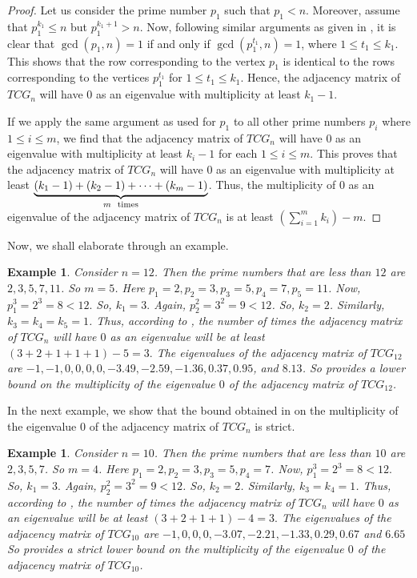 \documentclass[12pt]{article}
\newtheorem{example}[theorem]{Example}
\begin{document}
	
	\begin{proof}
		Let us consider the prime number $p_1$ such that $p_1< n$.
		Moreover, assume that $p_1^{k_1}\le n$ but $p_1^{k_1+1}>n$.
		Now, following similar arguments as given in , it is clear that $\gcd(p_1,n)=1$ if and only if $\gcd(p_1^{t_1},n)=1$, where $1\le t_1\le k_1$.
		This shows that the row corresponding to the vertex $p_1$ is identical to the rows corresponding to the vertices $p_1^{t_1}$ for $1\le t_1\le k_1$.
		Hence, the adjacency matrix of $TCG_n$ will have $0$ as an eigenvalue with multiplicity at least $k_1-1$.
		
		If we apply the same argument as used for $p_1$ to all other prime numbers $p_i$ where $1\le i\le m$, we find that the adjacency matrix of $TCG_n$ will have $0$ as an eigenvalue with multiplicity at least $k_i-1$ for each $1\le i\le m$. This proves that the adjacency matrix of $TCG_n$ will have $0$ as an eigenvalue with multiplicity at least $ \underbrace{(k_1-1)+(k_2-1)+\cdots+(k_m-1)}_{m \hspace{2mm} \text{times}}$. Thus, the multiplicity of $0$ as an eigenvalue of the adjacency matrix of $TCG_n$ is at least $(\sum_{i=1}^m k_i) -m$.
	\end{proof}
	Now, we shall elaborate  through an example.
	\begin{example}
		Consider $n=12$.
		Then the prime numbers that are less than $12$ are $2,3,5,7,11$.
		So $m=5$.
		Here $p_1=2,p_2=3,p_3=5,p_4=7,p_5=11$.
		Now, $p_1^3=2^3=8<12.$ So, $k_1=3.$
		Again, $p_2^2=3^2=9<12$. So, $k_2=2$.
		Similarly, $k_3=k_4=k_5=1$.
		Thus, according to , the number of times the adjacency matrix of $TCG_n$ will have $0$ as an eigenvalue will be at least $(3+2+1+1+1)-5 = 3.$
		The eigenvalues of the adjacency matrix of  $TCG_{12}$ are $-1, -1, 0, 0, 0, 0, -3.49, -2.59, -1.36, 0.37, 0.95$, and $8.13$.
		So  provides a lower bound on the multiplicity of the eigenvalue $0$ of the adjacency matrix of $TCG_{12}$.
		
	\end{example}
	
	In the next example, we show that the bound obtained in  on the multiplicity of the eigenvalue $0$ of the adjacency matrix of $TCG_n$
	is {strict}.
	
	\begin{example}
		Consider $n=10$.
		Then the prime numbers that are less than $10$ are $2,3,5,7$.
		So $m=4$.
		Here $p_1=2,p_2=3,p_3=5,p_4=7$.
		Now, $p_1^3=2^3=8<12.$ So, $k_1=3.$
		Again, $p_2^2=3^2=9<12$. So, $k_2=2$.
		Similarly, $k_3=k_4=1$.
		Thus, according to , the number of times the adjacency matrix of $TCG_n$ will have $0$ as an eigenvalue will be at least $(3+2+1+1)-4 = 3.$
		The eigenvalues of the adjacency matrix of  $TCG_{10}$ are $-1, 0, 0, 0, -3.07, -2.21, -1.33, 0.29, 0.67$ and $ 6.65$
		So  provides a {strict} lower bound on the multiplicity of the eigenvalue $0$ of the adjacency matrix of $TCG_{10}$.
		
	\end{example}
	
\end{document}
